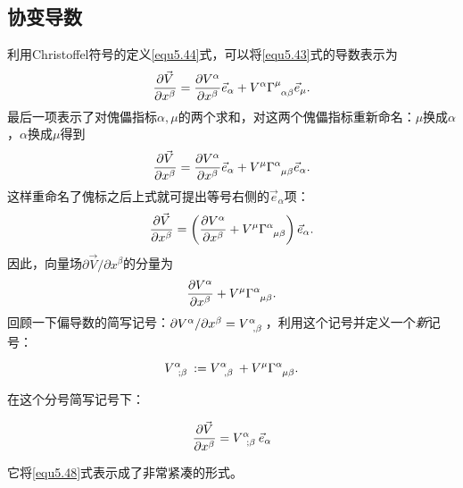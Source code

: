 \subsection*{协变导数}
利用Christoffel符号的定义\eqref{equ5.44}式，可以将\eqref{equ5.43}式的导数表示为
\begin{equation}
    \frac{\partial \vec{V}}{\partial x^\beta} = \frac{\partial V^\alpha}{\partial x^\beta} \vec{e}_\alpha + V^\alpha \Gamma\indices{^\mu_{\alpha \beta}} \vec{e}_\mu.
\label{equ5.46}
\end{equation}
最后一项表示了对傀儡指标$\alpha, \mu$的两个求和，对这两个傀儡指标重新命名：$\mu$换成$\alpha$，$\alpha$换成$\mu$得到
\begin{equation}
    \frac{\partial \vec{V}}{\partial x^\beta} = \frac{\partial V^\alpha}{\partial x^\beta} \vec{e}_\alpha + V^\mu \Gamma\indices{^\alpha_{\mu \beta}} \vec{e}_\alpha.
\label{equ5.47}
\end{equation}
这样重命名了傀标之后上式就可提出等号右侧的$\vec{e}_\alpha$项：
\begin{equation}
    \frac{\partial \vec{V}}{\partial x^\beta} = \left( \frac{\partial V^\alpha}{\partial x^\beta} + V^\mu \Gamma\indices{^\alpha_{\mu \beta}} \right) \vec{e}_\alpha.
\label{equ5.48}
\end{equation}
因此，向量场$\partial \vec{V} / \partial x^\beta$的分量为
\begin{equation}
    \frac{\partial V^\alpha}{\partial x^\beta} + V^\mu \Gamma\indices{^\alpha_{\mu \beta}}.
\label{equ5.49}
\end{equation}
回顾一下偏导数的简写记号：$\partial V^\alpha / \partial x^\beta = V\indices{^\alpha_{, \beta}}$，利用这个记号并定义一个\textit{新}记号：
\begin{shaded}
\begin{equation}
    V\indices{^\alpha_{; \beta}} := V\indices{^\alpha_{, \beta}} + V^\mu \Gamma\indices{^\alpha_{\mu \beta}}.
\label{equ5.50}
\end{equation}
\end{shaded}
在这个分号简写记号下：
\begin{shaded}
\begin{equation}
    \frac{\partial \vec{V}}{\partial x^\beta} = V\indices{^\alpha_{; \beta}} \vec{e}_\alpha
\label{equ5.51}
\end{equation}
\end{shaded}
它将\eqref{equ5.48}式表示成了非常紧凑的形式。

